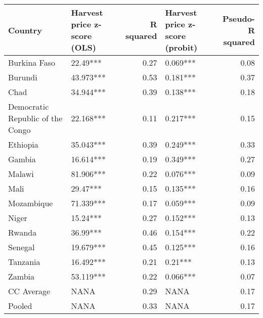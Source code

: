 \begin{table}[ht]
\centering
\begin{tabular}{llrlr}
  \hline
Country & Harvest price z-score (OLS) & R squared & Harvest price z-score (probit) & Pseudo-R squared \\ 
  \hline
Burkina Faso & 22.49*** & 0.27 & 0.069*** & 0.08 \\ 
  Burundi & 43.973*** & 0.53 & 0.181*** & 0.37 \\ 
  Chad & 34.944*** & 0.39 & 0.138*** & 0.18 \\ 
  Democratic Republic of the Congo & 22.168*** & 0.11 & 0.217*** & 0.15 \\ 
  Ethiopia & 35.043*** & 0.39 & 0.249*** & 0.33 \\ 
  Gambia & 16.614*** & 0.19 & 0.349*** & 0.27 \\ 
  Malawi & 81.906*** & 0.22 & 0.076*** & 0.09 \\ 
  Mali & 29.47*** & 0.15 & 0.135*** & 0.16 \\ 
  Mozambique & 71.339*** & 0.17 & 0.059*** & 0.09 \\ 
  Niger & 15.24*** & 0.27 & 0.152*** & 0.13 \\ 
  Rwanda & 36.99*** & 0.46 & 0.154*** & 0.22 \\ 
  Senegal & 19.679*** & 0.45 & 0.125*** & 0.16 \\ 
  Tanzania & 16.492*** & 0.21 & 0.21*** & 0.13 \\ 
  Zambia & 53.119*** & 0.22 & 0.066*** & 0.07 \\ 
  CC Average & NANA & 0.29 & NANA & 0.17 \\ 
  Pooled & NANA & 0.33 & NANA & 0.17 \\ 
   \hline
\end{tabular}
\end{table}
